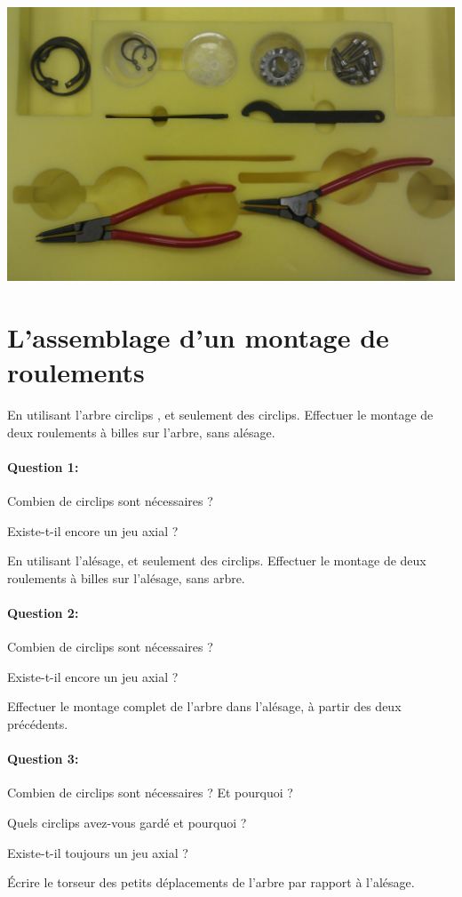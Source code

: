 \begin{center}
\includegraphics[width=0.5\linewidth]{img/Roulement8.jpg}
\end{center}

\newpage

\section{L'assemblage d'un montage de roulements}

En utilisant l'arbre \og circlips \fg, et seulement des circlips. Effectuer le montage de deux roulements à billes sur l'arbre, sans alésage.

\paragraph{Question 1:} Combien de circlips sont nécessaires ?

Existe-t-il encore un jeu axial ?

En utilisant l'alésage, et seulement des circlips. Effectuer le montage de deux roulements à billes sur l'alésage, sans arbre.

\paragraph{Question 2:} Combien de circlips sont nécessaires ?

Existe-t-il encore un jeu axial ?

Effectuer le montage complet de l'arbre dans l'alésage, à partir des deux
précédents.

\paragraph{Question 3:} Combien de circlips sont nécessaires ? Et pourquoi ?

Quels circlips avez-vous gardé et pourquoi ?

Existe-t-il toujours un jeu axial ?

Écrire le torseur des petits déplacements de l'arbre par rapport à l'alésage.

